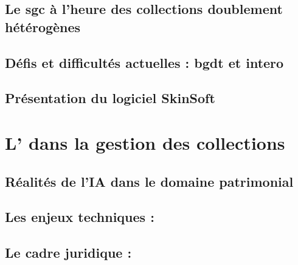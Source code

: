 \documentclass[12pt,twoside]{book}
\begin{document}
\section[\Gls{sgc} : définition]{Le \gls{sgc} à l’heure des collections doublement hétérogènes}



\newpage

\section[Défis et enjeux actuels]{Défis et difficultés actuelles : \gls{bgdt} et \gls{intero}}



\newpage

\section[Présentation du logiciel SkinSoft]{Présentation du logiciel SkinSoft }





\chapter[\gls{IA} et gestion des collections]{L' dans la gestion des collections}

\section{Réalités de l'\gls{IA} dans le domaine patrimonial}
\label{1.2.1}



\newpage

\section{Les enjeux techniques :}



\newpage

\section{Le cadre juridique :}


\end{document}
